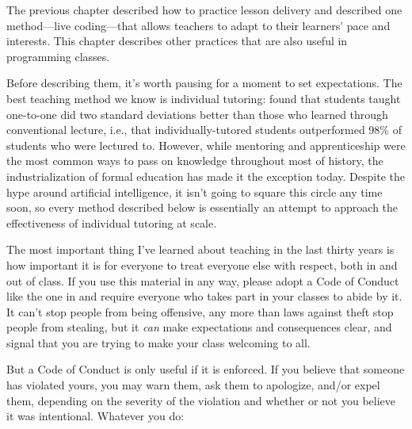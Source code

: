 
The previous chapter described how to practice lesson delivery
and described one method---live coding---that
allows teachers to adapt to their learners' pace and interests.
This chapter describes other practices that are also useful in programming classes.

Before describing them,
it's worth pausing for a moment to set expectations.
The best teaching method we know is individual tutoring:
\cite{Bloo1984} found that students taught one-to-one
did two standard deviations better than those who learned through conventional lecture,
i.e., that individually-tutored students outperformed
98\% of students who were lectured to.
However,
while mentoring and apprenticeship were the most common ways to pass on knowledge
throughout most of history,
the industrialization of formal education has made it the exception today.
Despite the hype around artificial intelligence,
it isn't going to square this circle any time soon,
so every method described below is essentially
an attempt to approach the effectiveness of individual tutoring at scale.


The most important thing I've learned about teaching in the last thirty years is
how important it is for everyone to treat everyone else with respect,
both in and out of class.
If you use this material in any way,
please adopt a Code of Conduct like the one in 
and require everyone who takes part in your classes to abide by it.
It can't stop people from being offensive,
any more than laws against theft stop people from stealing,
but it \emph{can} make expectations and consequences clear,
and signal that you are trying to make your class welcoming to all.

But a Code of Conduct is only useful if it is enforced.
If you believe that someone has violated yours,
you may warn them,
ask them to apologize,
and/or expel them,
depending on the severity of the violation and whether or not you believe it was intentional.
Whatever you do:

